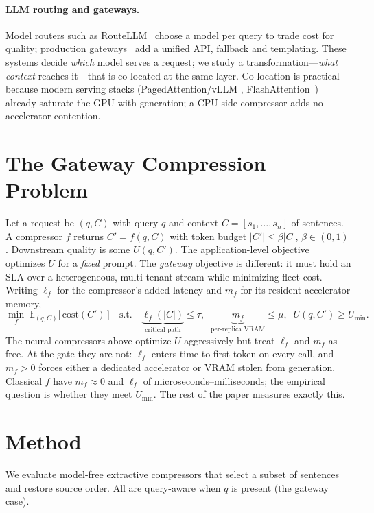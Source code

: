 \documentclass[11pt]{article}
\begin{document}
\paragraph{LLM routing and gateways.}
Model routers such as RouteLLM~\cite{routellm} choose a model per query to trade cost
for quality; production gateways~\cite{meshapi} add a unified API, fallback and
templating. These systems decide \emph{which} model serves a request; we study a
transformation---\emph{what context} reaches it---that is co-located at the same layer.
Co-location is practical because modern serving stacks (PagedAttention/vLLM
\cite{vllm}, FlashAttention~\cite{flashattention}) already saturate the GPU with
generation; a CPU-side compressor adds no accelerator contention.

\section{The Gateway Compression Problem}\label{sec:problem}
Let a request be $(q, C)$ with query $q$ and context $C=[s_1,\dots,s_n]$ of sentences.
A compressor $f$ returns $C'=f(q,C)$ with token budget $|C'|\le \beta|C|$, $\beta\in(0,1)$.
Downstream quality is some $U(q,C')$. The application-level objective optimizes $U$ for a
\emph{fixed} prompt. The \emph{gateway} objective is different: it must hold an SLA over a
heterogeneous, multi-tenant stream while minimizing fleet cost. Writing $\ell_f$ for the
compressor's added latency and $m_f$ for its resident accelerator memory,
\[
\min_{f}\ \mathbb{E}_{(q,C)}\big[\,\text{cost}(C') \,\big]
\quad\text{s.t.}\quad
\underbrace{\ell_f(|C|)}_{\text{critical path}}\!\le \tau,\;\;
\underbrace{m_f}_{\text{per-replica VRAM}}\!\le \mu,\;\;
U(q,C')\ge U_{\min}.
\]
The neural compressors above optimize $U$ aggressively but treat $\ell_f$ and $m_f$ as
free. At the gate they are not: $\ell_f$ enters time-to-first-token on every call, and
$m_f>0$ forces either a dedicated accelerator or VRAM stolen from generation. Classical
$f$ have $m_f\approx 0$ and $\ell_f$ of microseconds--milliseconds; the empirical
question is whether they meet $U_{\min}$. The rest of the paper measures exactly this.

\section{Method}\label{sec:method}
We evaluate model-free extractive compressors that select a subset of sentences and
restore source order. All are query-aware when $q$ is present (the gateway case).
\end{document}
